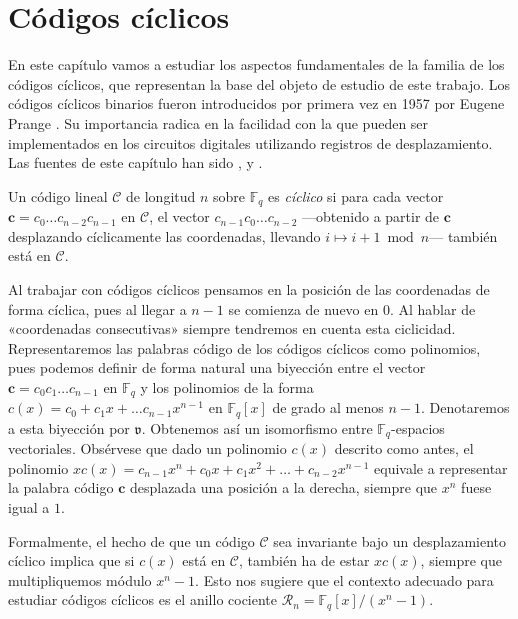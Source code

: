 
\chapter{Códigos cíclicos}

En este capítulo vamos a estudiar los aspectos fundamentales de la familia de los códigos cíclicos, que representan la base del objeto de estudio de este trabajo.
Los códigos cíclicos binarios fueron introducidos por primera vez en 1957 por Eugene Prange \parencite{prange_cyclic_1957}.
Su importancia radica en la facilidad con la que pueden ser implementados en los circuitos digitales utilizando registros de desplazamiento.
Las fuentes de este capítulo han sido \parencite{huffman_fundamentals_2003}, \parencite{kelbert_information_2013} y \parencite{macwilliams_theory_1977}.

\begin{definition}
  Un código lineal \(\mathcal C\) de longitud \(n\) sobre \(\mathbb F_q\) es \textit{cíclico} si para cada vector \(\mathbf c = c_0\dots c_{n-2}c_{n-1}\) en \(\mathcal C\), el vector \(c_{n-1}c_0\dots c_{n-2}\) —obtenido a partir de \(\mathbf c\) desplazando cíclicamente las coordenadas, llevando \(i \mapsto i +1 \bmod n\)— también está en \(\mathcal C\).
\end{definition}

Al trabajar con códigos cíclicos pensamos en la posición de las coordenadas de forma cíclica, pues al llegar a \(n -1\) se comienza de nuevo en \(0\).
Al hablar de «coordenadas consecutivas» siempre tendremos en cuenta esta ciclicidad.
Representaremos las palabras código de los códigos cíclicos como polinomios, pues podemos definir de forma natural una biyección entre el vector \(\mathbf c = c_0c_1\dots c_{n-1}\) en \(\mathbb F_q\) y los polinomios de la forma \(c(x) = c_0 + c_1x + \dots c_{n-1}x^{n-1}\) en \(\mathbb F_q[x]\) de grado al menos \(n-1\).
Denotaremos a esta biyección por \(\mathfrak v\).
Obtenemos así un isomorfismo entre \(\mathbb F_q\)-espacios vectoriales.
Obsérvese que dado un polinomio \(c(x)\) descrito como antes, el polinomio \(xc(x) = c_{n-1}x^n + c_0x + c_1x^2 + \dots + c_{n-2}x^{n-1}\) equivale a representar la palabra código \(\mathbf c\) desplazada una posición a la derecha, siempre que \(x^n\) fuese igual a \(1\).

Formalmente, el hecho de que un código \(\mathcal C\) sea invariante bajo un desplazamiento cíclico implica que si \(c(x)\) está en \(\mathcal C\), también ha de estar \(xc(x)\), siempre que multipliquemos módulo \(x^n -1\). 
Esto nos sugiere que el contexto adecuado para estudiar códigos cíclicos es el anillo cociente \(\mathcal R_n = \mathbb F_q[x]/(x^n - 1)\).

